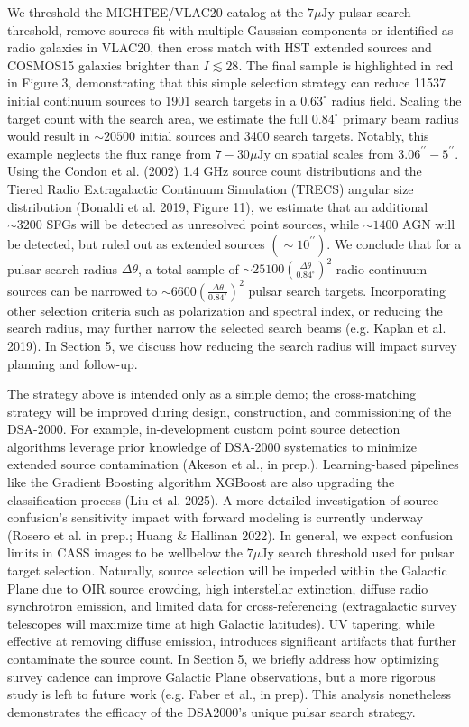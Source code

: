 \documentclass[10pt]{article}
\begin{document}
We threshold the MIGHTEE/VLAC20 catalog at the \(7 \mu \mathrm{Jy}\) pulsar search threshold, remove sources fit with multiple Gaussian components or identified as radio galaxies in VLAC20, then cross match with HST extended sources and COSMOS15 galaxies brighter than \(I \lesssim 28\). The final sample is highlighted in red in Figure 3, demonstrating that this simple selection strategy can reduce 11537 initial continuum sources to 1901 search targets in a \(0.63^{\circ}\) radius field. Scaling the target count with the search area, we estimate the full \(0.84^{\circ}\) primary beam radius would result in \(\sim 20500\) initial sources and 3400 search targets. Notably, this example neglects the flux range from \(7-30 \mu \mathrm{Jy}\) on spatial scales from \(3.06^{\prime \prime}-5^{\prime \prime}\). Using the Condon et al. (2002) 1.4 GHz source count distributions and the Tiered Radio Extragalactic Continuum Simulation (TRECS) angular size distribution (Bonaldi et al. 2019, Figure 11), we estimate that an additional \(\sim 3200\) SFGs will be detected as unresolved point sources, while \(\sim 1400\) AGN will be detected, but ruled out as extended sources \(\left(\sim 10^{\prime \prime}\right)\). We conclude that for a pulsar search radius \(\Delta \theta\), a total sample of \(\sim 25100\left(\frac{\Delta \theta}{0.84^{\circ}}\right)^{2}\) radio continuum sources can be narrowed to \(\sim 6600\left(\frac{\Delta \theta}{0.84^{\circ}}\right)^{2}\) pulsar search targets. Incorporating other selection criteria such as polarization and spectral index, or reducing the search radius, may further narrow the selected search beams (e.g. Kaplan et al. 2019). In Section 5, we discuss how reducing the search radius will impact survey planning and follow-up.

The strategy above is intended only as a simple demo; the cross-matching strategy will be improved during design, construction, and commissioning of the DSA-2000. For example, in-development custom point source detection algorithms leverage prior knowledge of DSA-2000 systematics to minimize extended source contamination (Akeson et al., in prep.). Learning-based pipelines like the Gradient Boosting algorithm XGBoost are also upgrading the classification process (Liu et al. 2025). A more detailed investigation of source confusion's sensitivity impact with forward modeling is currently underway (Rosero et al. in prep.; Huang \& Hallinan 2022). In general, we expect confusion limits in CASS images to be wellbelow the \(7 \mu \mathrm{Jy}\) search threshold used for pulsar target selection. Naturally, source selection will be impeded within the Galactic Plane due to OIR source crowding, high interstellar extinction, diffuse radio synchrotron emission, and limited data for cross-referencing (extragalactic survey telescopes will maximize time at high Galactic latitudes). UV tapering, while effective at removing diffuse emission, introduces significant artifacts that further contaminate the source count. In Section 5, we briefly address how optimizing survey cadence can improve Galactic Plane observations, but a more rigorous study is left to future work (e.g. Faber et al., in prep). This analysis nonetheless demonstrates the efficacy of the DSA2000's unique pulsar search strategy.
\end{document}
